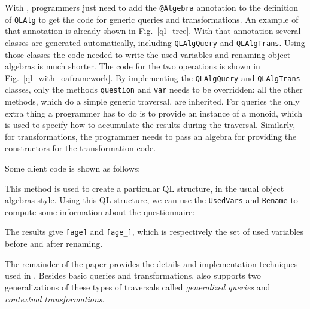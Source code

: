 With \Name, programmers just need to add the \lstinline{@Algebra} annotation
to the definition of \lstinline{QLAlg} to get the code for generic
queries and transformations. An example of that annotation is already
shown in Fig.~\ref{ql_tree}. With that annotation several classes
are generated automatically, including \lstinline{QLAlgQuery} and
\lstinline{QLAlgTrans}. Using those classes the code needed to write
the used variables and renaming object algebras is much
shorter. The code for the two operations is shown in
Fig.~\ref{ql_with_oaframework}. By implementing the
\lstinline{QLAlgQuery} and \lstinline{QLAlgTrans} classes, only the methods
\lstinline{question} and \lstinline{var} needs to be overridden: all the other methods,
which do a simple generic traversal, are inherited. For queries the
only extra thing a programmer has to do is to provide an instance of a
monoid, which is used to specify how to accumulate the results during
the traversal. Similarly, for transformations, the programmer needs to
pass an algebra for providing the constructors for the transformation
code.

Some client code is shown as follows: %


This method is used to create a particular QL structure, in the
usual object algebras style.
Using this QL structure, we can use the \lstinline{UsedVars}
and \lstinline{Rename} to compute some information about the questionnaire:


The results give \lstinline{[age]} and \lstinline{[age_]}, which
is respectively the set of used variables before and after renaming.

The remainder of the paper provides the details and implementation
techniques used in \Name. Besides basic queries and transformations,
\name also supports two generalizations of these types of traversals
called \emph{generalized queries} and \emph{contextual transformations}.

